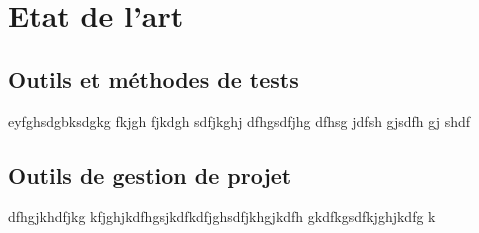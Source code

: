 \chapter{Etat de l'art}
\thispagestyle{fancy}
\label{chap:EtatArt}
\section{Outils et méthodes de tests}
eyfghsdgbksdgkg fkjgh fjkdgh sdfjkghj dfhgsdfjhg dfhsg jdfsh gjsdfh gj shdf 
\label{sec:OutilsTests}
\section{Outils de gestion de projet}
 dfhgjkhdfjkg kfjghjkdfhgsjkdfkdfjghsdfjkhgjkdfh gkdfkgsdfkjghjkdfg k
\label{sec:OutilsGestion}
